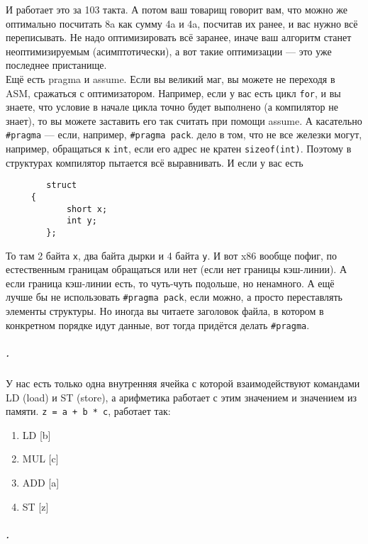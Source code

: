 \documentclass{article}
\begin{document}
    И работает это за 103 такта. А потом ваш товарищ говорит вам, что можно же оптимально посчитать 8a как сумму 4a и 4a, посчитав их ранее, и вас нужно всё переписывать. Не надо оптимизировать всё заранее, иначе ваш алгоритм станет неоптимизируемым (асимптотически), а вот такие оптимизации --- это уже последнее пристанище.\\
    Ещё есть pragma и assume. Если вы великий маг, вы можете не переходя в ASM, сражаться с оптимизатором. Например, если у вас есть цикл \texttt{for}, и вы знаете, что условие в начале цикла точно будет выполнено (а компилятор не знает), то вы можете заставить его так считать при помощи assume. А касательно \texttt{#pragma} --- если, например, \texttt{#pragma pack}. дело в том, что не все железки могут, например, обращаться к \texttt{int}, если его адрес не кратен \texttt{sizeof(int)}. Поэтому в структурах компилятор пытается всё выравнивать. И если у вас есть
    \begin{verbatim}
        struct
     {
            short x;
            int y;
        };
    \end{verbatim}
    То там 2 байта \texttt{x}, два байта дырки и 4 байта \texttt{y}. И вот x86 вообще пофиг, по естественным границам обращаться или нет (если нет границы кэш-линии). А если граница кэш-линии есть, то чуть-чуть подольше, но ненамного. А ещё лучше бы не использовать \texttt{#pragma pack}, если можно, а просто переставлять элементы структуры. Но иногда вы читаете заголовок файла, в котором в конкретном порядке идут данные, вот тогда придётся делать \texttt{#pragma}.
    \subparagraph{.}
    У нас есть только одна внутренняя ячейка с которой взаимодействуют командами LD (load) и ST (store), а арифметика работает с этим значением и значением из памяти. \texttt{z = a + b * c}, работает так:
    \begin{enumerate}
        \item LD [b]
        \item MUL [c]
        \item ADD [a]
        \item ST [z]
    \end{enumerate}
    \subparagraph{.}
\end{document}
